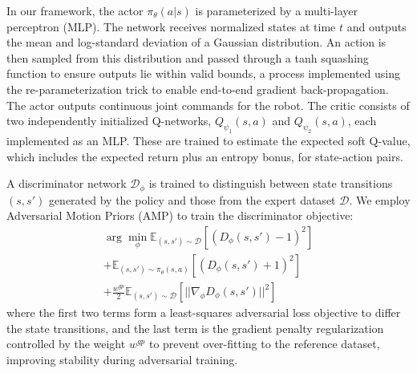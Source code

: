 \documentclass[letterpaper, 10pt, conference]{IEEEtran}
\begin{document}
In our framework, the actor $\pi_{\theta}(a|s)$ is parameterized by a multi-layer perceptron (MLP). The network receives normalized states at time $t$ and outputs the mean and log-standard deviation of a Gaussian distribution. An action is then sampled from this distribution and passed through a tanh squashing function to ensure outputs lie within valid bounds, a process implemented using the re-parameterization trick to enable end-to-end gradient back-propagation. The actor outputs continuous joint commands for the robot. The critic consists of two independently initialized Q-networks, $Q_{\psi_{1}}(s,a)$ and $Q_{\psi_{2}}(s,a)$, each implemented as an MLP. These are trained to estimate the expected soft Q-value, which includes the expected return plus an entropy bonus, for state-action pairs.

A discriminator network $\mathcal{D}_{\phi}$ is trained to distinguish between state transitions $(s,s')$ generated by the policy and those from the expert dataset $\mathcal{D}$. We employ Adversarial Motion Priors (AMP) \cite{Peng2021} to train the discriminator objective:
\begin{multline}
\arg \min_{\phi}\mathbb{E}_{(s,s')\sim\mathcal{D}}[(D_{\phi}(s,s')-1)^{2}] \\
+\mathbb{E}_{(s,s')\sim\pi_{\theta}(s,a)}[(D_{\phi}(s,s')+1)^{2}] \\
+\frac{w^{gp}}{2}\mathbb{E}_{(s,s')\sim\mathcal{D}}[||\nabla_{\phi}D_{\phi}(s,s')||^{2}]
\end{multline}
where the first two terms form a least-squares adversarial loss objective to differ the state transitions, and the last term is the gradient penalty regularization controlled by the weight $w^{gp}$ to prevent over-fitting to the reference dataset, improving stability during adversarial training.
\end{document}
